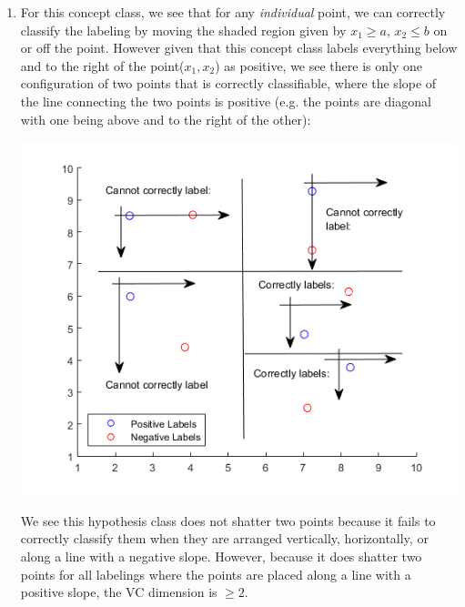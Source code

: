 \documentclass[11pt,a4paper]{article}
\begin{document}
\begin{itemize}
\begin{enumerate} [label={\alph*)}]
					\item For this concept class, we see that for any \textit{individual} point, we can correctly classify the labeling by moving the shaded region given by $x_1 \geq a$, $x_2 \leq b$ on or off the point. However given that this concept class labels everything below and to the right of the point($x_1,x_2$) as positive, we see there is only one configuration of two points that is correctly classifiable, where the slope of the line connecting the two points is positive (e.g. the points are diagonal with one being above and to the right of the other):
					\begin{center}
						\includegraphics[width=1\linewidth]{q3b}
					\end{center}
					
					We see this hypothesis class does not shatter two points because it fails to correctly classify them when they are arranged vertically, horizontally, or along a line with a negative slope. However, because it does shatter two points for all labelings where the points are placed along a line with a positive slope, the VC dimension is $\geq 2$.\\
					

\end{enumerate}
\end{itemize}
\end{document}
